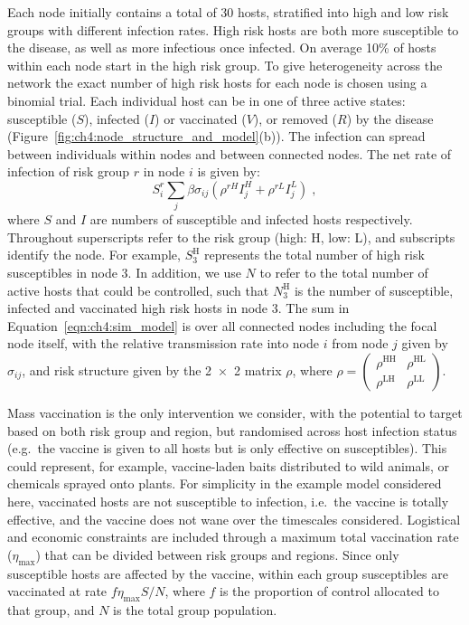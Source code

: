 Each node initially contains a total of 30 hosts, stratified into high and low risk groups with different infection rates. High risk hosts are both more susceptible to the disease, as well as more infectious once infected. On average 10\% of hosts within each node start in the high risk group. To give heterogeneity across the network the exact number of high risk hosts for each node is chosen using a binomial trial. Each individual host can be in one of three active states: susceptible ($S$), infected ($I$) or vaccinated ($V$), or removed ($R$) by the disease (Figure~\ref{fig:ch4:node_structure_and_model}(b)). The infection can spread between individuals within nodes and between connected nodes. The net rate of infection of risk group $r$ in node $i$ is given by:
\begin{equation}\label{eqn:ch4:sim_model}
    S_i^r \sum_j\beta\sigma_{ij} \left(\rho^{rH}I_j^H + \rho^{rL}I_j^L\right)\;,
\end{equation}
where $S$ and $I$ are numbers of susceptible and infected hosts respectively. Throughout superscripts refer to the risk group (high: H, low: L), and subscripts identify the node. For example, $S_{3}^\mathrm{H}$ represents the total number of high risk susceptibles in node 3. In addition, we use $N$ to refer to the total number of active hosts that could be controlled, such that $N_{3}^\mathrm{H}$ is the number of susceptible, infected and vaccinated high risk hosts in node 3. The sum in Equation~\ref{eqn:ch4:sim_model} is over all connected nodes including the focal node itself, with the relative transmission rate into node $i$ from node $j$ given by $\sigma_{ij}$, and risk structure given by the \num{2x2} matrix $\rho$, where $\rho = \left(\begin{smallmatrix}
    \rho^{\mathrm{HH}}& \rho^{\mathrm{HL}}\\
    \rho^{\mathrm{LH}}& \rho^{\mathrm{LL}}
    \end{smallmatrix}\right)$.

Mass vaccination is the only intervention we consider, with the potential to target based on both risk group and region, but randomised across host infection status (e.g.\ the vaccine is given to all hosts but is only effective on susceptibles). This could represent, for example, vaccine-laden baits distributed to wild animals, or chemicals sprayed onto plants. For simplicity in the example model considered here, vaccinated hosts are not susceptible to infection, i.e.\ the vaccine is totally effective, and the vaccine does not wane over the timescales considered. Logistical and economic constraints are included through a maximum total vaccination rate ($\eta_{\mathrm{max}}$) that can be divided between risk groups and regions. Since only susceptible hosts are affected by the vaccine, within each group susceptibles are vaccinated at rate $f\eta_{\mathrm{max}}S/N$, where $f$ is the proportion of control allocated to that group, and $N$ is the total group population.


